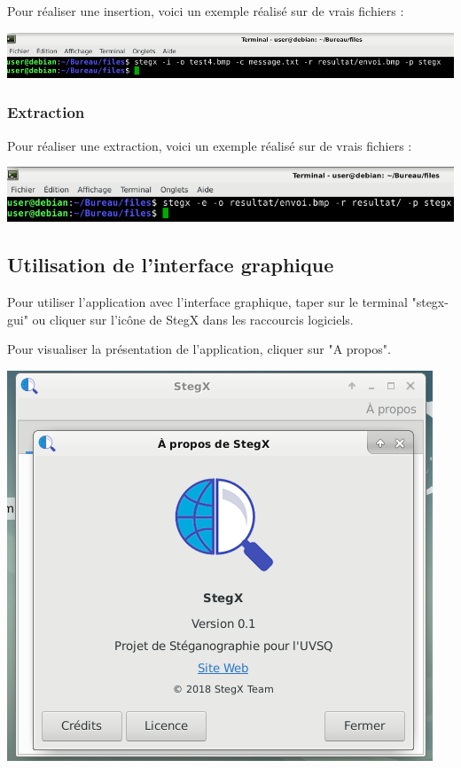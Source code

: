\documentclass[11pt]{article}
\begin{document}
Pour réaliser une insertion, voici un exemple réalisé sur de vrais 
fichiers : 

\vspace{0.5cm}
\hspace{-2cm}
\includegraphics[scale=0.8]{pictures/insertion.png}
\vspace{1cm}

\subsubsection{Extraction}

Pour réaliser une extraction, voici un exemple réalisé sur de vrais 
fichiers :

\vspace{0.5cm}
\includegraphics[scale=0.8]{pictures/extraction.png}

\subsection{Utilisation de l'interface graphique}

Pour utiliser l'application avec l'interface graphique, taper sur le 
terminal "stegx-gui" ou cliquer sur l'icône de StegX dans les raccourcis 
logiciels. 

Pour visualiser la présentation de l'application, cliquer sur "A propos". 

\vspace{0.5cm}
\hspace{2cm}
\includegraphics[scale=0.8]{pictures/a_propos.png}
\vspace{1cm}
\end{document}
